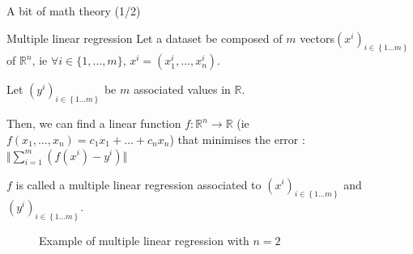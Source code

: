 \begin{frame}{A bit of math theory (1/2)}
    \begin{block}{Multiple linear regression}
        Let a dataset be composed of $m$ vectors$\ensuremath{\left(x^{i}\right)_{i\in\left\{ 1\dots m\right\} }}$
        of $\mathbb{R}^{n}$, ie $\forall i\in\{1,\dots ,m\}$, $x^{i}=(x_{1}^{i},\dots,x_{n}^{i})$. 

        Let $\left(y^{i}\right)_{i\in\left\{ 1\dots m\right\}}$
        be $m$ associated values in $\mathbb{R}$.

        Then, we can find a linear function $f:\mathbb{R}^{n}\rightarrow\mathbb{R}$
        (ie $f(x_{1},\dots,x_{n})=c_{1}x_{1}+\dots+c_{n}x_{n}$) that minimises
        the error : $\Vert\sum_{i=1}^{m}(f(x^{i})-y^{i})\Vert$

        $f$ is called a multiple linear regression associated to $\left(x^{i}\right)_{i\in\left\{ 1\dots m\right\}}$
        and $\left(y^{i}\right)_{i\in\left\{ 1\dots m\right\}}$.
    \end{block}
    \begin{figure}
        \caption{Example of multiple linear regression with $n=2$}
    \end{figure}
\end{frame}

